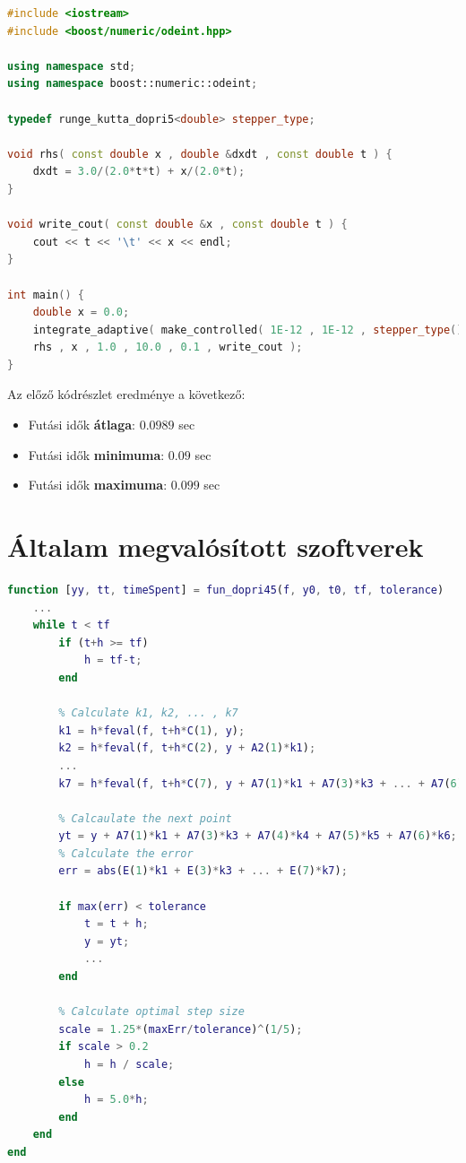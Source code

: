 \begin{lstlisting}[caption={Odeint példakód.}, captionpos=b, language = C++]
#include <iostream>
#include <boost/numeric/odeint.hpp>

using namespace std;
using namespace boost::numeric::odeint;

typedef runge_kutta_dopri5<double> stepper_type;

void rhs( const double x , double &dxdt , const double t ) {
	dxdt = 3.0/(2.0*t*t) + x/(2.0*t);
}

void write_cout( const double &x , const double t ) {
	cout << t << '\t' << x << endl;
}

int main() {
	double x = 0.0;    
	integrate_adaptive( make_controlled( 1E-12 , 1E-12 , stepper_type() ) ,
	rhs , x , 1.0 , 10.0 , 0.1 , write_cout );
}
\end{lstlisting}
\pagebreak
Az előző kódrészlet eredménye a következő:



\begin{itemize}
	\item Futási idők \textbf{átlaga}: $ 0.0989 $ sec
	\item Futási idők \textbf{minimuma}: $ 0.09 $ sec
	\item Futási idők \textbf{maximuma}: $ 0.099 $ sec
\end{itemize}

\section {Általam megvalósított szoftverek} \label{fejezet3_2}

\begin{lstlisting}[caption={Matlab kód ode45 használata nélkül.}, captionpos=b, language = Matlab]
function [yy, tt, timeSpent] = fun_dopri45(f, y0, t0, tf, tolerance)
	...
	while t < tf
		if (t+h >= tf)
			h = tf-t;
		end
		
		% Calculate k1, k2, ... , k7
		k1 = h*feval(f, t+h*C(1), y);
		k2 = h*feval(f, t+h*C(2), y + A2(1)*k1);
		...
		k7 = h*feval(f, t+h*C(7), y + A7(1)*k1 + A7(3)*k3 + ... + A7(6)*k6);
		
		% Calcaulate the next point
		yt = y + A7(1)*k1 + A7(3)*k3 + A7(4)*k4 + A7(5)*k5 + A7(6)*k6;
		% Calculate the error
		err = abs(E(1)*k1 + E(3)*k3 + ... + E(7)*k7);
		
		if max(err) < tolerance
			t = t + h;
			y = yt;
			...
		end
		
		% Calculate optimal step size
		scale = 1.25*(maxErr/tolerance)^(1/5);
		if scale > 0.2
			h = h / scale;
		else
			h = 5.0*h;
		end
	end
end
\end{lstlisting}

